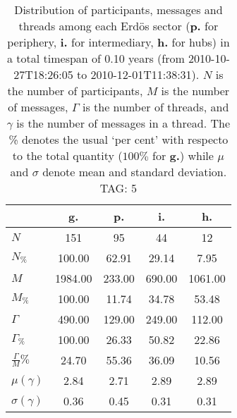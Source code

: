 \begin{table}[h!]
\begin{center}
\begin{tabular}{| l || c | c | c | c |}\hline
 & {\bf g.} & {\bf p.} & {\bf i.} & {\bf h.} \\\hline\hline
$N$ & 151  & 95  & 44  & 12 \\
$N_{\%}$ & 100.00  & 62.91  & 29.14  & 7.95 \\\hline
$M$ & 1984.00  & 233.00  & 690.00  & 1061.00 \\
$M_{\%}$ & 100.00  & 11.74  & 34.78  & 53.48 \\\hline
$\Gamma$ & 490.00  & 129.00  & 249.00  & 112.00 \\
$\Gamma_{\%}$ & 100.00  & 26.33  & 50.82  & 22.86 \\\hline
$\frac{\Gamma}{M}\%$ & 24.70  & 55.36  & 36.09  & 10.56 \\
$\mu(\gamma)$ & 2.84  & 2.71  & 2.89  & 2.89 \\
$\sigma(\gamma)$ & 0.36  & 0.45  & 0.31  & 0.31 \\\hline
\end{tabular}
\caption{Distribution of participants, messages and threads among each Erd\"os sector ({\bf p.} for periphery, {\bf i.} for intermediary, 
    {\bf h.} for hubs) in a total timespan of 0.10 years (from 2010-10-27T18:26:05 to 2010-12-01T11:38:31). $N$ is the number of participants, $M$ is the number of messages, $\Gamma$ is the number of threads, and $\gamma$ is the number of messages in a thread.
    The \% denotes the usual `per cent' with respecto to the total quantity ($100\%$ for {\bf g.})
    while $\mu$ and $\sigma$ denote mean and standard deviation. TAG: 5}
\end{center}
\end{table}